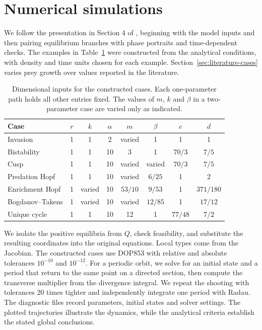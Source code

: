 \section{Numerical simulations}\label{sec:numerical}
We follow the presentation in Section 4 of \citet{haque11}, beginning with the model inputs and then pairing equilibrium branches with phase portraits and time-dependent checks. The examples in Table~\ref{tab:constructed} were constructed from the analytical conditions, with density and time units chosen for each example. Section~\ref{sec:literature-cases} varies prey growth over values reported in the literature.

\begin{table}[!htbp]\centering
\caption{Dimensional inputs for the constructed cases. Each one-parameter path holds all other entries fixed. The values of \(m\), \(k\) and \(\beta\) in a two-parameter case are varied only as indicated.}
\label{tab:constructed}
\begin{tabular}{@{}lccccccc@{}}
\toprule
Case & \(r\) & \(k\) & \(\alpha\) & \(m\) & \(\beta\) & \(e\) & \(d\) \\ \midrule
Invasion & 1 & 1 & 2 & varied & 1 & 1 & 1\\
Bistability & 1 & 1 & 10 & 3 & 1 & \(70/3\) & \(7/5\)\\
Cusp & 1 & 1 & 10 & varied & varied & \(70/3\) & \(7/5\)\\
Predation Hopf & 1 & 1 & 10 & varied & \(6/25\) & 1 & 2\\
Enrichment Hopf & 1 & varied & 10 & \(53/10\) & \(9/53\) & 1 & \(371/180\)\\
Bogdanov--Takens & 1 & varied & 10 & varied & \(12/85\) & 1 & \(17/12\)\\
Unique cycle & 1 & 1 & 10 & 12 & 1 & \(77/48\) & \(7/2\)\\
\bottomrule
\end{tabular}
\end{table}

We isolate the positive equilibria from \(Q\), check feasibility, and substitute the resulting coordinates into the original equations. Local types come from the Jacobian. The constructed cases use DOP853 with relative and absolute tolerances \(10^{-10}\) and \(10^{-12}\). For a periodic orbit, we solve for an initial state and a period that return to the same point on a directed section, then compute the transverse multiplier from the divergence integral. We repeat the shooting with tolerances 20 times tighter and independently integrate one period with Radau. The diagnostic files record parameters, initial states and solver settings. The plotted trajectories illustrate the dynamics, while the analytical criteria establish the stated global conclusions.

